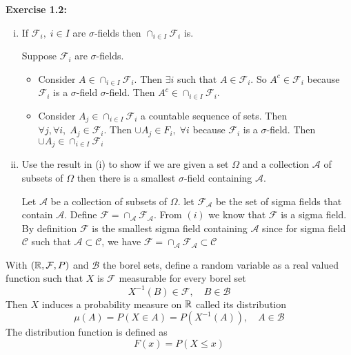 \pagebreak
\textbf{Exercise 1.2:} 
\begin{enumerate}[i)]
    \item If $\mathcal{F}_i, \; i\in I$ are $\sigma$-fields then $\cap_{i \in I}\mathcal{F}_i$ is.
    \begin{mdframed}
        Suppose $\mathcal{F}_i$ are $\sigma$-fields. 
        \begin{itemize}
            \item Consider $A \in \cap_{i \in I}\mathcal{F}_i$. Then $\exists i$ such that $A \in \mathcal{F}_i$. So $A^c \in \mathcal{F}_i$ because $\mathcal{F}_i$ is a $\sigma$-field $\sigma$-field. Then $A^c \in \cap_{i \in I}\mathcal{F}_i$. 
            \item Consider $A_j \in \cap_{i \in I}\mathcal{F}_i$ a countable sequence of sets. Then $\forall j, \forall i, \; A_j \in \mathcal{F}_i$. Then $\cup A_j \in F_i, \; \forall i$ because $\mathcal{F}_i$ is a $\sigma$-field. Then $\cup A_j \in \cap_{i \in I}\mathcal{F}_i$ 
        \end{itemize}
        \end{mdframed}
    \item Use the result in (i) to show if we are given a set $\Omega$ and a collection $\mathcal{A}$ of subsets of $\Omega$ then there is a smallest $\sigma$-field containing $\mathcal{A}$.
    \begin{mdframed}
        Let $\mathcal{A}$ be a collection of subsets of $\Omega$. let $\mathcal{F}_\mathcal{A}$ be the set of sigma fields that contain $\mathcal{A}$. Define $\mathcal{F} = \cap_{\mathcal{A}}\mathcal{F}_\mathcal{A}$. From $(i)$ we know that $\mathcal{F}$ is a sigma field. By definition $\mathcal{F}$ is the smallest sigma field containing $\mathcal{A}$ since for sigma field $\mathcal{C}$ such that $\mathcal{A} \subset \mathcal{C}$, we have $\mathcal{F}=\cap_{\mathcal{A}}\mathcal{F}_\mathcal{A} \subset \mathcal{C}$
    \end{mdframed}
\end{enumerate}

\noindent With $(\mathbb{R}, \mathcal{F}, P)$ and $\mathcal{B}$ the borel sets, define a random variable as a real valued function such that $X$ is $\mathcal{F}$ measurable for every borel set \[X^{-1}(B)\in \mathcal{F}, \quad B \in \mathcal{B}\]
Then $X$ induces a probability measure on $\mathbb{R}$ called its distribution \[\mu(A) = P(X \in A) = P(X^{-1}(A)), \quad A \in \mathcal{B}\]
The distribution function is defined as \[F(x) = P(X \leq x)\]




